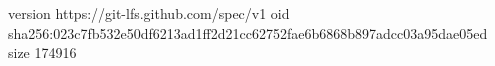 version https://git-lfs.github.com/spec/v1
oid sha256:023c7fb532e50df6213ad1ff2d21cc62752fae6b6868b897adcc03a95dae05ed
size 174916
